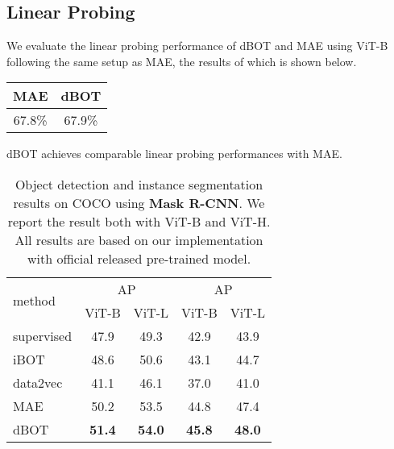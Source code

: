 \documentclass[10pt,twocolumn,letterpaper]{article}
\def\ourmethod{{dBOT}\xspace}
\begin{document}
\subsection{Linear Probing}
We evaluate the linear probing performance of \ourmethod and MAE using ViT-B following the same setup as MAE, the results of which is shown below. 
\begin{table}[h]
\vspace{-0.2cm}
    \begin{center}
    \setlength{\tabcolsep}{3mm}
    \begin{tabular}{cc}
        MAE & dBOT  \\
        \hline
        67.8\% & 67.9\% \\
    \end{tabular}
    \end{center}
    \label{tab:my_label}
\vspace{-0.8cm}
\end{table}

dBOT achieves comparable linear probing performances with MAE.

\begin{table}[t]
    \begin{center}
    \setlength{\tabcolsep}{3mm}
    \begin{tabular}{l|cccc}
        \multirow{2}{*}{method}& \multicolumn{2}{c}{AP} & \multicolumn{2}{c}{AP}\\
        &ViT-B&ViT-L&ViT-B&ViT-L\\
        \hline
        \textcolor{gray!80}{supervised}&\textcolor{gray!80}{47.9}&\textcolor{gray!80}{49.3}&\textcolor{gray!80}{42.9}&\textcolor{gray!80}{43.9}\\
        iBOT~\cite{zhou2021ibot}&48.6&50.6&43.1&44.7\\
        data2vec~\cite{baevski2022data2vec}&41.1&46.1&37.0&41.0\\
        MAE~\cite{mae}&50.2&53.5&44.8&47.4\\
        \hline
        \ourmethod&\textbf{51.4}&\textbf{54.0}&\textbf{45.8}&\textbf{48.0}\\
    \end{tabular}
    \end{center}
    \caption{Object detection and instance segmentation results on COCO using \textbf{Mask R-CNN}. We report the result both with ViT-B and ViT-H. All results are based on our implementation with official released pre-trained model.}
    \label{app:tab:cocodet}
\end{table}
\end{document}
